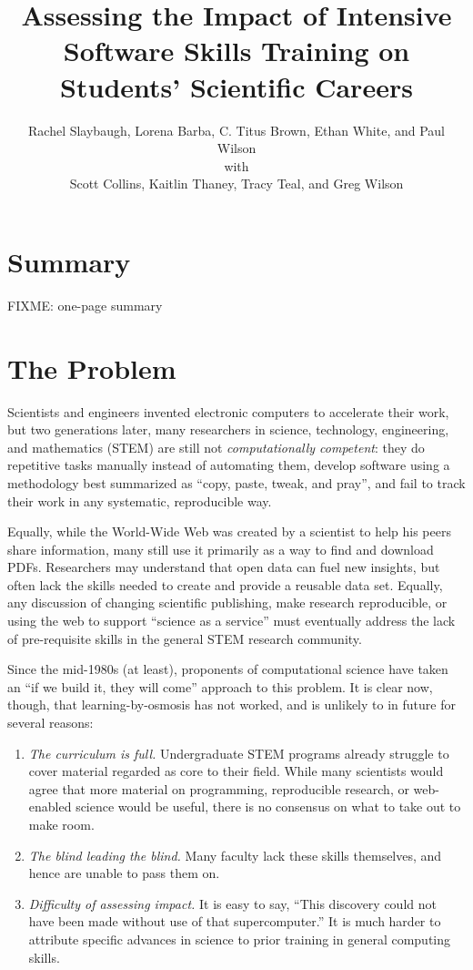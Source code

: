 \documentclass[11pt]{article}
\title{
  Assessing the Impact of Intensive Software Skills Training
  on Students' Scientific Careers
}
\author{
  Rachel Slaybaugh, Lorena Barba, C. Titus Brown, Ethan White, and Paul Wilson\\
  with\\
  Scott Collins, Kaitlin Thaney, Tracy Teal, and Greg Wilson
}
\begin{document}
\maketitle
\pagebreak

\section{Summary}

FIXME: one-page summary

\pagebreak

\section{The Problem}

Scientists and engineers invented electronic computers to accelerate
their work, but two generations later, many researchers in science,
technology, engineering, and mathematics (STEM) are still not
\emph{computationally competent}: they do repetitive tasks manually
instead of automating them, develop software using a methodology best
summarized as ``copy, paste, tweak, and pray'', and fail to track
their work in any systematic, reproducible way.

Equally, while the World-Wide Web was created by a scientist to help
his peers share information, many still use it primarily as a way to
find and download PDFs.  Researchers may understand that open data can
fuel new insights, but often lack the skills needed to create and
provide a reusable data set.  Equally, any discussion of changing
scientific publishing, make research reproducible, or using the web to
support ``science as a service'' must eventually address the lack of
pre-requisite skills in the general STEM research community.

Since the mid-1980s (at least), proponents of computational science
have taken an ``if we build it, they will come'' approach to this
problem.  It is clear now, though, that learning-by-osmosis has not
worked, and is unlikely to in future for several reasons:

\begin{enumerate}

\item
  \emph{The curriculum is full.}  Undergraduate STEM programs already
  struggle to cover material regarded as core to their field.  While
  many scientists would agree that more material on programming,
  reproducible research, or web-enabled science would be useful, there
  is no consensus on what to take out to make room.

\item
  \emph{The blind leading the blind.}  Many faculty lack these skills
  themselves, and hence are unable to pass them on.

\item
  \emph{Difficulty of assessing impact.} It is easy to say, ``This
  discovery could not have been made without use of that
  supercomputer.''  It is much harder to attribute specific advances
  in science to prior training in general computing skills.

\end{enumerate}
\end{document}

